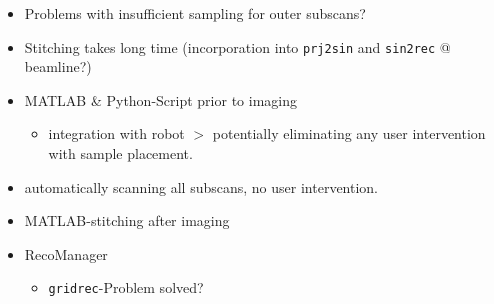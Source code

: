 \begin{itemize}
	\item Problems with insufficient sampling for outer subscans?
	\item Stitching takes long time (incorporation into \verb+prj2sin+ and \verb+sin2rec+ @ beamline?)
\end{itemize}

\begin{itemize}
	\item MATLAB \& Python-Script prior to imaging
	\begin{itemize}
		\item integration with robot $>$ potentially eliminating any user intervention with sample placement.
	\end{itemize}
	\item automatically scanning all subscans, no user intervention.
	\item MATLAB-stitching after imaging
	\item RecoManager
	\begin{itemize}
		\item \verb+gridrec+-Problem solved?
	\end{itemize}
\end{itemize}

